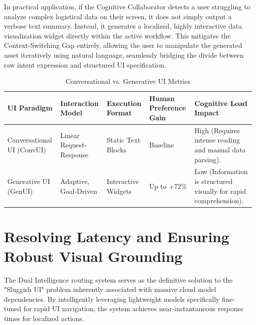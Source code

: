 \documentclass[12pt, a4paper]{report}
\begin{document}
In practical application, if the Cognitive Collaborator detects a user struggling to analyze complex logistical data on their screen, it does not simply output a verbose text summary. Instead, it generates a localized, highly interactive data visualization widget directly within the active workflow.\cite{hojo2025} This mitigates the Context-Switching Gap entirely, allowing the user to manipulate the generated asset iteratively using natural language, seamlessly bridging the divide between raw intent expression and structured UI specification.\cite{hojo2025}

\begin{table}[H]
    \centering
    \caption{Conversational vs. Generative UI Metrics}
    \label{tab:ui_metrics}
    \begin{tabularx}{\textwidth}{>{\raggedright\arraybackslash}X >{\raggedright\arraybackslash}X >{\raggedright\arraybackslash}X >{\raggedright\arraybackslash}X >{\raggedright\arraybackslash}X}
    \toprule
    \textbf{UI Paradigm} & \textbf{Interaction Model} & \textbf{Execution Format} & \textbf{Human Preference Gain} & \textbf{Cognitive Load Impact} \\
    \midrule
    Conversational UI (ConvUI) & Linear Request-Response & Static Text Blocks & Baseline & High (Requires intense reading and manual data parsing).\cite{arxiv2508} \\
    \midrule
    Generative UI (GenUI) & Adaptive, Goal-Driven & Interactive Widgets & Up to +72\%\cite{arxiv2508} & Low (Information is structured visually for rapid comprehension).\cite{arxiv2508v2} \\
    \bottomrule
    \end{tabularx}
\end{table}

\section{Resolving Latency and Ensuring Robust Visual Grounding}
The Dual Intelligence routing system serves as the definitive solution to the "Sluggish UI" problem inherently associated with massive cloud model dependencies.\cite{hojo2025} By intelligently leveraging lightweight models specifically fine-tuned for rapid UI navigation, the system achieves near-instantaneous response times for localized actions.\cite{hojo2025}
\end{document}
